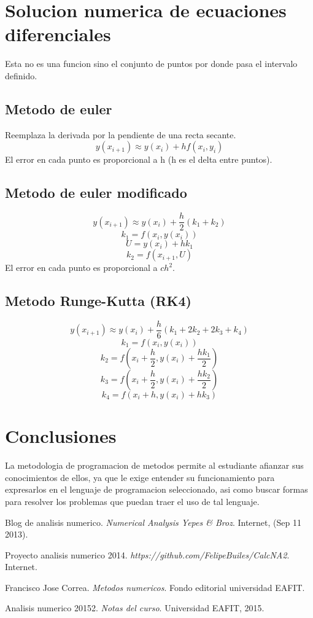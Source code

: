\documentclass[11pt]{article}
\begin{document}
\section{Solucion numerica de ecuaciones diferenciales}
Esta no es una funcion sino el conjunto de puntos por donde pasa el intervalo definido.
\subsection{Metodo de euler}
Reemplaza la derivada por la pendiente de una recta secante.
\[ y(x_{i+1}) \approx y(x_{i}) + hf(x_{i},y_{i})\]
El error en cada punto es proporcional a h (h es el delta entre puntos).
\subsection{Metodo de euler modificado}
\[ y(x_{i+1}) \approx y(x_{i}) + \dfrac{h}{2} (k_{1}+k_{2})\]
\[ k_{1} = f(x_{i},y(x_{i})) \]
\[ U = y(x_{i}) + hk_{1}\]
\[ k_{2} = f(x_{i+1}, U)\]
El error en cada punto es proporcional a $ch^{2}$.

\subsection{Metodo Runge-Kutta (RK4)}
\[ y(x_{i+1}) \approx y(x_{i}) + \dfrac{h}{6} (k_{1}+2k_{2}+2k_{3}+k_{4})\]
\[ k_{1} = f(x_{i},y(x_{i})) \]
\[ k_{2} = f(x_{i}+\dfrac{h}{2},y(x_{i}) + \dfrac{hk_{1}}{2}) \]
\[ k_{3} = f(x_{i}+\dfrac{h}{2},y(x_{i}) + \dfrac{hk_{2}}{2}) \]
\[ k_{4} = f(x_{i}+h,y(x_{i}) + hk_{3}) \]

\newpage
\section{Conclusiones}
La metodologia de programacion de metodos permite al estudiante afianzar sus conocimientos
de ellos, ya que le exige entender su funcionamiento para expresarlos en el lenguaje de
programacion seleccionado, asi como buscar formas para resolver los problemas que puedan
traer el uso de tal lenguaje.

\begin{thebibliography}{9}
  Blog de analisis numerico.
  \textit{Numerical Analysis Yepes \& Broz}.
  Internet, (Sep 11 2013).

  Proyecto analisis numerico 2014.
  \textit{https://github.com/FelipeBuiles/CalcNA2}.
  Internet.

  Francisco Jose Correa.
  \textit{Metodos numericos}.
  Fondo editorial universidad EAFIT.

  Analisis numerico 20152.
  \textit{Notas del curso}.
  Universidad EAFIT, 2015.
  
\end{thebibliography}
\end{document}
